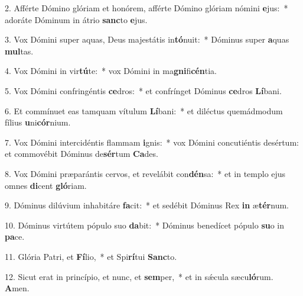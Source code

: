 2. Afférte Dómino glóriam et honórem, afférte Dómino glóriam nómini \textbf{e}jus:~*  adoráte Dóminum in átrio \textbf{sanc}to \textbf{e}jus.\

3. Vox Dómini super aquas, Deus majestátis in\textbf{tó}nuit:~*  Dóminus super \textbf{a}quas \textbf{mul}tas.\

4. Vox Dómini in vir\textbf{tú}te:~*  vox Dómini in ma\textbf{gni}fi\textbf{cén}tia.\

5. Vox Dómini confringéntis \textbf{ce}dros:~*  et confrínget Dóminus \textbf{ce}dros \textbf{Lí}bani.\

6. Et commínuet eas tamquam vítulum \textbf{Lí}bani:~*  et diléctus quemádmodum fílius \textbf{u}ni\textbf{cór}nium.\

7. Vox Dómini intercidéntis flammam \textbf{i}gnis:~*  vox Dómini concutiéntis desértum: et commovébit Dóminus de\textbf{sér}tum \textbf{Ca}des.\

8. Vox Dómini præparántis cervos, et revelábit con\textbf{dén}sa:~*  et in templo ejus omnes \textbf{di}cent \textbf{gló}riam.\

9. Dóminus dilúvium inhabitáre \textbf{fa}cit:~*  et sedébit Dóminus Rex \textbf{in} æ\textbf{tér}num.\

10. Dóminus virtútem pópulo suo \textbf{da}bit:~*  Dóminus benedícet pópulo \textbf{su}o in \textbf{pa}ce.\

11. Glória Patri, et \textbf{Fí}lio,~*  et Spi\textbf{rí}tui \textbf{Sanc}to.\

12. Sicut erat in princípio, et nunc, et \textbf{sem}per,~*  et in sǽcula sæcu\textbf{ló}rum. \textbf{A}men.\

